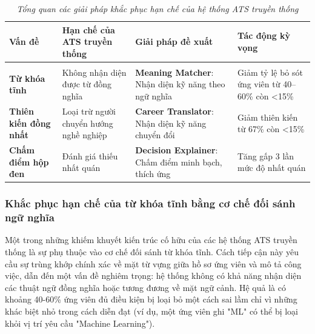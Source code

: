 \documentclass{article}
\begin{document}
\begin{longtable}{|
  >{\raggedright\arraybackslash}p{}|
  >{\raggedright\arraybackslash}p{}|
  >{\raggedright\arraybackslash}p{}|
  >{\raggedright\arraybackslash}p{}|}
  \hline
  \textbf{Vấn đề} &
  \textbf{Hạn chế của ATS truyền thống} &
  \textbf{Giải pháp đề xuất} &
  \textbf{Tác động kỳ vọng} \\
  \hline
  \endfirsthead

  \endhead

  \hline
  \endfoot

  \hline
  \caption{\centering\textit{Tổng quan các giải pháp khắc phục hạn chế của hệ thống ATS truyền thống}}
  \label{tab:ats-solutions} \\
  \endlastfoot

  \textbf{Từ khóa tĩnh} &
  Không nhận diện được từ đồng nghĩa &
  \textbf{Meaning Matcher}: Nhận diện kỹ năng theo ngữ nghĩa &
  Giảm tỷ lệ bỏ sót ứng viên từ 40–60\% còn <15\% \\
  \hline

  \textbf{Thiên kiến đồng nhất} &
  Loại trừ người chuyển hướng nghề nghiệp &
  \textbf{Career Translator}: Nhận diện kỹ năng chuyển đổi &
  Giảm thiên kiến từ 67\% còn <15\% \\
  \hline

  \textbf{Chấm điểm hộp đen} &
  Đánh giá thiếu nhất quán &
  \textbf{Decision Explainer}: Chấm điểm minh bạch, thích ứng &
  Tăng gấp 3 lần mức độ nhất quán \\
\end{longtable}

\subsubsection{Khắc phục hạn chế của từ khóa tĩnh bằng cơ chế đối sánh ngữ nghĩa}
Một trong những khiếm khuyết kiến trúc cố hữu của các hệ thống ATS truyền thống là sự phụ thuộc vào cơ chế đối sánh từ khóa tĩnh. Cách tiếp cận này yêu cầu sự trùng khớp chính xác về mặt từ vựng giữa hồ sơ ứng viên và mô tả công việc, dẫn đến một vấn đề nghiêm trọng: hệ thống không có khả năng nhận diện các thuật ngữ đồng nghĩa hoặc tương đương về mặt ngữ cảnh. Hệ quả là có khoảng 40-60\% ứng viên đủ điều kiện bị loại bỏ một cách sai lầm chỉ vì những khác biệt nhỏ trong cách diễn đạt (ví dụ, một ứng viên ghi "ML" có thể bị loại khỏi vị trí yêu cầu "Machine Learning").
\end{document}
